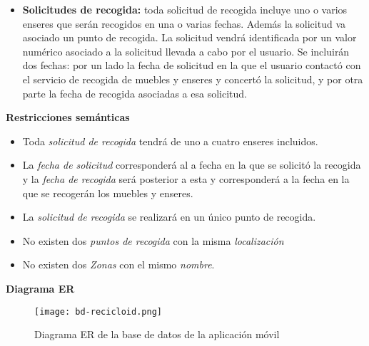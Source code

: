 \begin{itemize}
\item \textbf{Solicitudes de recogida: }toda solicitud de recogida incluye uno o varios enseres que serán recogidos en una o varias fechas. Además la solicitud va asociado un punto de recogida. La solicitud vendrá identificada por un valor numérico asociado a la solicitud llevada  a cabo por el usuario. Se incluirán dos fechas: por un lado la fecha de solicitud en la que el usuario contactó con el servicio de recogida de muebles y enseres y concertó la solicitud, y por otra parte la fecha de recogida asociadas a esa solicitud. 

\end{itemize}

\textbf{Restricciones semánticas} \
\
\begin{itemize}

\item Toda \textit{solicitud de recogida} tendrá de uno a cuatro {enseres} incluidos.

\item La \textit{fecha de solicitud} corresponderá al a fecha en la que se solicitó la recogida y la \textit{fecha de recogida} será posterior a esta y corresponderá a la fecha en la que se recogerán los muebles y enseres.

\item  La \textit{solicitud de recogida} se realizará en un único punto de recogida.

\item No existen dos \textit{puntos de recogida} con la misma \textit{localización}

\item No existen dos \textit{Zonas} con el mismo \textit{nombre}.

\end{itemize}

\textbf{Diagrama ER}

\begin{figure}[H]
\centering
	\texttt{[image: bd-recicloid.png]} 
  	 \caption{Diagrama ER de la base de datos de la aplicación móvil}
\end{figure}
